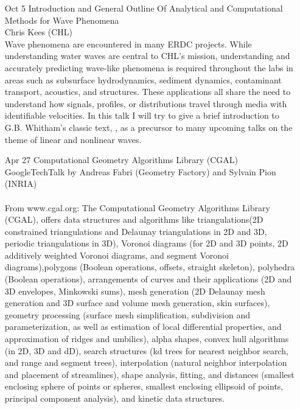 \documentclass[12]{article}
\begin{document}
\begin{enumerate}

\item[Oct 5] Introduction and General Outline Of Analytical and
  Computational Methods for Wave Phenomena\\ Chris Kees (CHL)\\ Wave
  phenomena are encountered in many ERDC projects. While understanding
  water waves are central to CHL's mission, understanding and
  accurately predicting wave-like phenomena is required throughout the
  labs in areas such as subsurface hydrodynamics, sediment dynamics,
  contaminant transport, acoustics, and structures.  These
  applications all share the need to understand how signals, profiles,
  or distributions travel through media with identifiable
  velocities. In this talk I will try to give a brief introduction to
  G.B. Whitham's classic text, ,
  as a precursor to many upcoming talks on the theme of linear and
  nonlinear waves.

\item[Apr 27]Computational Geometry Algorithms Library (CGAL)\\GoogleTechTalk by Andreas Fabri (Geometry Factory) and Sylvain Pion (INRIA)\\
\\
From www.cgal.org: The Computational Geometry Algorithms Library (CGAL), offers data structures and algorithms like triangulations(2D constrained triangulations and Delaunay triangulations in 2D and 3D, periodic triangulations in 3D), Voronoi diagrams (for 2D and 3D points, 2D additively weighted Voronoi diagrams, and segment Voronoi diagrams),polygons (Boolean operations, offsets, straight skeleton), polyhedra (Boolean operations), arrangements of curves and their applications (2D and 3D envelopes, Minkowski sums), mesh generation (2D Delaunay mesh generation and 3D surface and volume mesh generation, skin surfaces), geometry processing (surface mesh simplification, subdivision and parameterization, as well as estimation of local differential properties, and approximation of ridges and umbilics), alpha shapes, convex hull algorithms (in 2D, 3D and dD), search structures (kd trees for nearest neighbor search, and range and segment trees), interpolation (natural neighbor interpolation and placement of streamlines), shape analysis, fitting, and distances (smallest enclosing sphere of points or spheres, smallest enclosing ellipsoid of points, principal component analysis), and kinetic data structures.


\end{enumerate}
\end{document}
